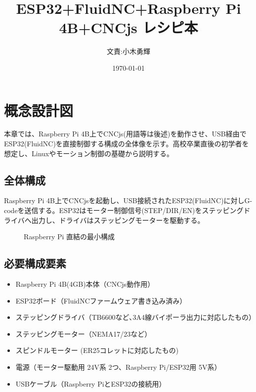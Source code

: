 \documentclass[uplatex,dvipdfmx]{ujarticle}
\begin{document}
\title{ESP32+FluidNC+Raspberry Pi 4B+CNCjs レシピ本}
\author{文責:小木勇輝}
\date{\today}
\maketitle

\tableofcontents


\section{概念設計図}

本章では、Raspberry Pi 4B上でCNCjs(用語等は後述)を動作させ、USB経由でESP32(FluidNC)を直接制御する構成の全体像を示す。高校卒業直後の初学者を想定し、Linuxやモーション制御の基礎から説明する。

\subsection{全体構成}

Raspberry Pi 4B上でCNCjsを起動し、USB接続されたESP32(FluidNC)に対しG-codeを送信する。ESP32はモーター制御信号(STEP/DIR/EN)をステッピングドライバへ出力し、ドライバはステッピングモーターを駆動する。

\begin{figure}[h]
\centering
{}
\caption{Raspberry Pi 直結の最小構成}
\end{figure}

\subsection{必要構成要素}
\begin{itemize}
    \item Raspberry Pi 4B(4GB)本体（CNCjs動作用）
    \item ESP32ボード（FluidNCファームウェア書き込み済み）
    \item ステッピングドライバ（TB6600など､3A4線バイポーラ出力に対応したもの）
    \item ステッピングモーター（NEMA17/23など）
    \item スピンドルモーター (ER25コレットに対応したもの)
    \item 電源（モーター駆動用 24V系 2つ、Raspberry Pi/ESP32用 5V系）
    \item USBケーブル（Raspberry PiとESP32の接続用）
\end{itemize}
\end{document}
